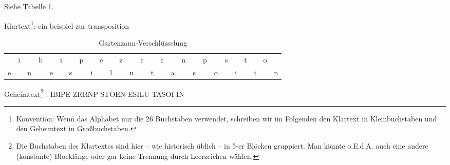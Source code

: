 \begin{refsegment}
\begin{itemize}
   Siehe Tabelle \ref{PaP_RailFence_table-reference}.

   Klartext\footnote{%
     Konvention: Wenn das Alphabet nur die 26 Buchstaben
     verwendet, schreiben wir im Folgenden den Klartext in Kleinbuchstaben
     und den Geheimtext in Großbuchstaben.
   }:
   ein beispiel zur transposition

   \begin{table}[ht]
   \begin{center}
   \begin{tabular}{r@{\:}r@{\:}r@{\:}r@{\:}r@{\:}r@{\:}r@{\:}r@{\:}r@{\:}
                r@{\:}r@{\:}r@{\:}r@{\:}r@{\:}r@{\:}r@{\:}r@{\:}r@{\:}
                r@{\:}r@{\:}r@{\:}r@{\:}r@{\:}r@{\:}r@{\:}r@{\:}r@{\:}}
	  & i &   & b &   & i &   & p &   & e &   & z &   & r &   &
            r &   & n &   & p &   & s &   & t &   & o &   \\
	e &   & n &   & e &   & s &   & i &   & l &   & u &   & t &
          & a &   & s &   & o &   & i &   & i &   & n
   \end{tabular}
   \caption{Gartenzaun-Verschlüsselung}
   \label{PaP_RailFence_table-reference}
   \end{center}
   \end{table}

   Geheimtext\footnote{Die Buchstaben des Klartextes sind hier -- wie
   historisch üblich -- in 5-er Blöcken gruppiert. Man könnte o.E.d.A.
   auch eine andere (konstante) Blocklänge oder gar keine Trennung durch
   Leerzeichen wählen.}%
   : IBIPE ZRRNP STOEN ESILU TASOI IN\\



\end{itemize}
\end{refsegment}
